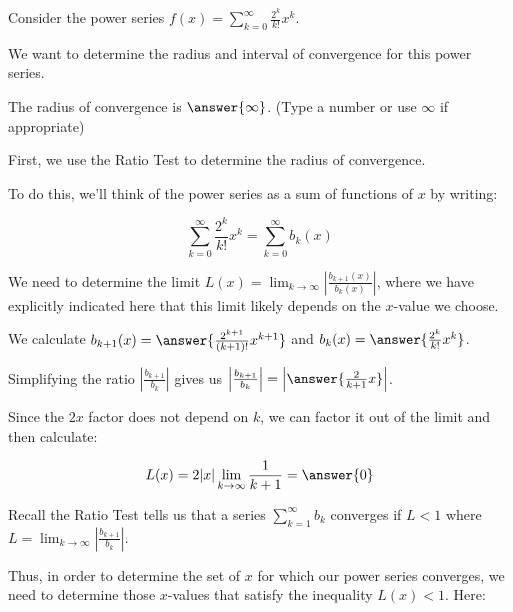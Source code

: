 \documentclass{ximera}
\author{Jim Talamo}
\begin{document}
\begin{exercise}
Consider the power series $f(x) = \sum_{k=0}^{\infty} \frac{2^k}{k!}x^k$.

We want to determine the radius and interval of convergence for this power series. 

The radius of convergence is $\answer{\infty}$.
(Type a number or use $\infty$ if appropriate)

\begin{hint}
First, we use the Ratio Test to determine the radius of convergence. 

To do this, we'll think of the power series as a sum of functions of $x$ by writing: 

\[
\sum_{k=0}^{\infty} \frac{2^k}{k!}x^{k} = \sum_{k=0}^{\infty} b_k(x)
\]

We need to determine the limit $L(x) = \lim_{k \to \infty} \left| \frac{b_{k+1}(x)}{b_k(x)}\right|$, where we have explicitly indicated here that this limit likely depends on the $x$-value we choose. 

We calculate $b_{k+1}(x)=\answer{\frac{2^{k+1}}{(k+1)!}x^{k+1}}$ and $b_k(x)=\answer{ \frac{2^k}{k!}x^k}$. 

\begin{question}

Simplifying the ratio $\left|\frac{b_{k+1}}{b_k}\right|$ gives us $\left|\frac{b_{k+1}}{b_k}\right|=\left|\answer{\frac{2}{k+1} x} \right|$.


\begin{question}

Since the $2x$ factor does not depend on $k$, we can factor it out of the limit and then calculate:

\[
L(x) = 2|x| \lim_{k \to \infty}   \frac{1}{k+1}  =\answer{ 0}
\]

\begin{question}

Recall the Ratio Test tells us that a series $\sum^{\infty}_{k=1} b_k$ converges if $L <1$ where $L=\lim_{k \to \infty}\left| \frac{b_{k+1}}{b_k}\right|$. 

Thus, in order to determine the set of $x$ for which our power series converges, we need to determine those $x$-values that satisfy the inequality $L(x) <1$. Here:

\begin{multipleChoice}
\end{multipleChoice}


\end{question}
\end{question}
\end{question}
\end{hint}
\end{exercise}
\end{document}
